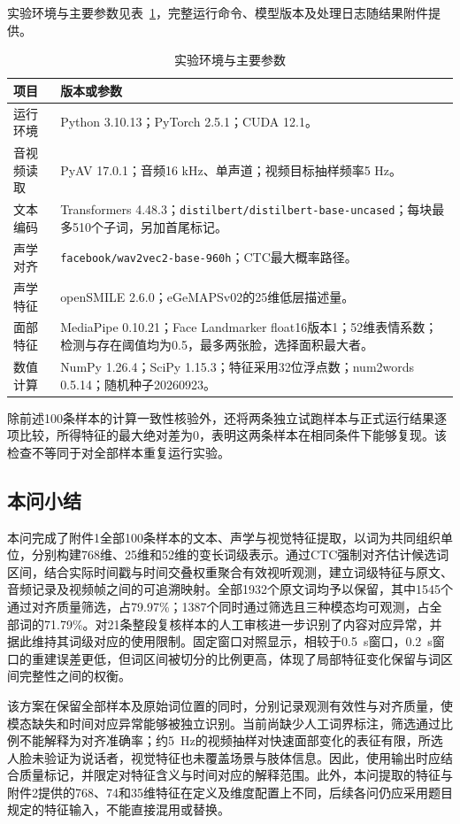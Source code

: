 实验环境与主要参数见表~\ref{tab:p1_repro_settings}，完整运行命令、模型版本及处理日志随结果附件提供。

\begin{table}[H]
    \centering\small
    \caption{实验环境与主要参数}
    \label{tab:p1_repro_settings}
    \setlength{\tabcolsep}{6pt}
    \renewcommand{\arraystretch}{1.12}
    \ifdefined\pOneCompactTableBox\else\newsavebox{\pOneCompactTableBox}\fi
    \begin{lrbox}{\pOneCompactTableBox}
    \begin{tabular}{l>{\raggedright\arraybackslash}p{27em}}
        \toprule
        项目 & 版本或参数\\
        \midrule
        运行环境 & Python 3.10.13；PyTorch 2.5.1；CUDA 12.1。\\
        音视频读取 & PyAV 17.0.1；音频16 kHz、单声道；视频目标抽样频率5 Hz。\\
        文本编码 & Transformers 4.48.3；\nolinkurl{distilbert/distilbert-base-uncased}；每块最多510个子词，另加首尾标记。\\
        声学对齐 & \nolinkurl{facebook/wav2vec2-base-960h}；CTC最大概率路径。\\
        声学特征 & openSMILE 2.6.0；eGeMAPSv02的25维低层描述量。\\
        面部特征 & MediaPipe 0.10.21；Face Landmarker float16版本1；52维表情系数；检测与存在阈值均为0.5，最多两张脸，选择面积最大者。\\
        数值计算 & NumPy 1.26.4；SciPy 1.15.3；特征采用32位浮点数；num2words 0.5.14；随机种子20260923。\\
        \bottomrule
    \end{tabular}
    \end{lrbox}
    \usebox{\pOneCompactTableBox}
\end{table}

除前述100条样本的计算一致性核验外，还将两条独立试跑样本与正式运行结果逐项比较，所得特征的最大绝对差为0，表明这两条样本在相同条件下能够复现。该检查不等同于对全部样本重复运行实验。

\subsection{本问小结}

本问完成了附件1全部100条样本的文本、声学与视觉特征提取，以词为共同组织单位，分别构建768维、25维和52维的变长词级表示。通过CTC强制对齐估计候选词区间，结合实际时间戳与时间交叠权重聚合有效视听观测，建立词级特征与原文、音频记录及视频帧之间的可追溯映射。全部1932个原文词均予以保留，其中1545个通过对齐质量筛选，占79.97\%；1387个同时通过筛选且三种模态均可观测，占全部词的71.79\%。对21条整段复核样本的人工审核进一步识别了内容对应异常，并据此维持其词级对应的使用限制。固定窗口对照显示，相较于0.5~s窗口，0.2~s窗口的重建误差更低，但词区间被切分的比例更高，体现了局部特征变化保留与词区间完整性之间的权衡。

该方案在保留全部样本及原始词位置的同时，分别记录观测有效性与对齐质量，使模态缺失和时间对应异常能够被独立识别。当前尚缺少人工词界标注，筛选通过比例不能解释为对齐准确率；约5~Hz的视频抽样对快速面部变化的表征有限，所选人脸未验证为说话者，视觉特征也未覆盖场景与肢体信息。因此，使用输出时应结合质量标记，并限定对特征含义与时间对应的解释范围。此外，本问提取的特征与附件2提供的768、74和35维特征在定义及维度配置上不同，后续各问仍应采用题目规定的特征输入，不能直接混用或替换。
